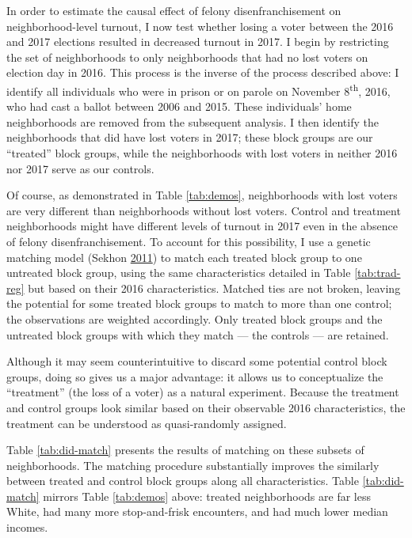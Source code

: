 \documentclass[
  12pt,
]{article}
\begin{document}
In order to estimate the causal effect of felony disenfranchisement on neighborhood-level turnout, I now test whether losing a voter between the 2016 and 2017 elections resulted in decreased turnout in 2017. I begin by restricting the set of neighborhoods to only neighborhoods that had no lost voters on election day in 2016. This process is the inverse of the process described above: I identify all individuals who were in prison or on parole on November 8\textsuperscript{th}, 2016, who had cast a ballot between 2006 and 2015. These individuals' home neighborhoods are removed from the subsequent analysis. I then identify the neighborhoods that did have lost voters in 2017; these block groups are our ``treated'' block groups, while the neighborhoods with lost voters in neither 2016 nor 2017 serve as our controls.

Of course, as demonstrated in Table \ref{tab:demos}, neighborhoods with lost voters are very different than neighborhoods without lost voters. Control and treatment neighborhoods might have different levels of turnout in 2017 even in the absence of felony disenfranchisement. To account for this possibility, I use a genetic matching model (Sekhon \protect\hyperlink{ref-Sekhon2011}{2011}) to match each treated block group to one untreated block group, using the same characteristics detailed in Table \ref{tab:trad-reg} but based on their 2016 characteristics. Matched ties are not broken, leaving the potential for some treated block groups to match to more than one control; the observations are weighted accordingly. Only treated block groups and the untreated block groups with which they match --- the controls --- are retained.

Although it may seem counterintuitive to discard some potential control block groups, doing so gives us a major advantage: it allows us to conceptualize the ``treatment'' (the loss of a voter) as a natural experiment. Because the treatment and control groups look similar based on their observable 2016 characteristics, the treatment can be understood as quasi-randomly assigned.

Table \ref{tab:did-match} presents the results of matching on these subsets of neighborhoods. The matching procedure substantially improves the similarly between treated and control block groups along all characteristics. Table \ref{tab:did-match} mirrors Table \ref{tab:demos} above: treated neighborhoods are far less White, had many more stop-and-frisk encounters, and had much lower median incomes.
\end{document}
